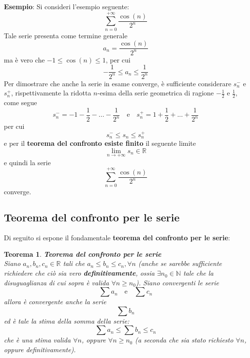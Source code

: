 \documentclass[a4paper]{extarticle}
\newtheorem{theorem}{Teorema}[section]
\begin{document}
\vspace{1em}
\noindent
\textbf{Esempio}: Si consideri l'esempio seguente:
\[\sum_{n=0}^{+\infty} \frac{\cos(n)}{2^n}\]
Tale serie presenta come termine generale
\[a_n = \frac{\cos(n)}{2^n}\]
ma è vero che $-1 \leq \cos(n) \leq 1$, per cui
\[-\frac{1}{2^n} \leq a_n \leq \frac{1}{2^n}\]
Per dimostrare che anche la serie in esame converge, è sufficiente considerare $s_n^-$ e $s_n^+$, rispettivamente la ridotta $n$-esima della serie geometrica di ragione $-\frac{1}{2}$ e $\frac{1}{2}$, come segue
\[s_n^- = -1 - \frac{1}{2} - ... - \frac{1}{2^n} \hspace{1em} \text{e} \hspace{1em} s_n^+ = 1 + \frac{1}{2} + ... + \frac{1}{2^n}\]
per cui
\[s_n^- \leq s_n \leq s_n^+\]
e per il \textbf{teorema del confronto esiste finito} il seguente limite
\[\lim_{n \to +\infty} s_n \in \mathbb{R}\]
e quindi la serie
\[\sum_{n=0}^{+\infty} \frac{\cos(n)}{2^n}\]
converge.

\vspace{1em}
\noindent
\subsection{Teorema del confronto per le serie}
Di seguito si espone il fondamentale \textbf{teorema del confronto per le serie}:

\vspace{1em}
\noindent
\begin{theorem} \textbf{Teorema del confronto per le serie}\\
    Siano $a_n,b_n,c_n \in \mathbb{R}$ tali che $a_n \leq b_n \leq c_n, \forall n$ (anche se sarebbe sufficiente richiedere che ciò sia vero \textbf{definitivamente}, ossia $\exists n_0 \in \mathbb{N}$ tale che la disuguaglianza di cui sopra è valida $\forall n \geq n_0$). Siano convergenti le serie
    \[\sum a_n \hspace{1em} \text{e} \hspace{1em} \sum c_n\]
    allora è convergente anche la serie
    \[\sum b_n\]
    ed è tale la stima della somma della serie:
    \[\sum a_n \leq \sum b_n \leq c_n\]
    che è una stima valida $\forall n$, oppure $\forall n \geq n_0$ (a seconda che sia stato richiesto $\forall n$, oppure definitivamente).
\end{theorem}
\end{document}
